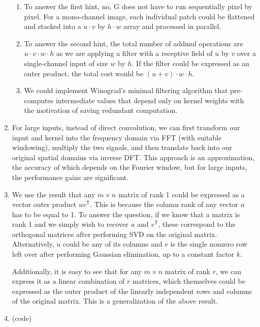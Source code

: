 \documentclass{article}
\begin{document}
\begin{enumerate}[label=(\roman*)]
\begin{enumerate}
\item To answer the first hint, no, G does not have to run sequentially pixel by pixel. For a mono-channel image, each individual patch could be flattened and stacked into a $u\cdot v$ by $h\cdot w$ array and processed in parallel.

\item To answer the second hint, the total number of addmul operations are $u \cdot v \cdot w \cdot h$ as we are applying a filter with a receptive field of $u$ by $v$ over a single-channel input of size $w$ by $h$. If the filter could be expressed as an outer product, the total cost would be $(u+v) \cdot w \cdot h$.

\item We could implement Winograd's minimal filtering algorithm that pre-computes intermediate values that depend only on kernel weights with the motivation of saving redundant computation.
\end{enumerate}

\item For large inputs, instead of direct convolution, we can first transform our input and kernel into the frequency domain via FFT (with suitable windowing), multiply the two signals, and then translate back into our original spatial domains via inverse DFT. This approach is an approximation, the accuracy of which depends on the Fourier window, but for large inputs, the performance gains are significant.

\item %
We use the result that any $m\times n$ matrix of rank 1 could be expressed as a vector outer product $uv^\mathsf{T}$. This is because the column rank of any vector $u$ has to be equal to 1. To answer the question, if we know that a matrix is rank 1 and we simply wish to recover $u$ and $v^\mathsf{T}$, these correspond to the orthogonal matrices after performing SVD on the original matrix. Alternatively, $u$ could be any of its columns and $v$ is the single nonzero row left over after performing Gaussian elimination, up to a constant factor $k$.

Additionally, it is easy to see that for any $m\times n$ matrix of rank $r$, we can express it as a linear combination of $r$ matrices, which themselves could be expressed as the outer product of the linearly independent rows and columns of the original matrix. This is a generalization of the above result.

\item %
(code)


\end{enumerate}
\end{document}
